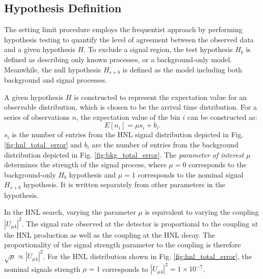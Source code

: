 


\subsection{Hypothesis Definition}
\label{sec:hypothesis_def}
The setting limit procedure employs the frequentist approach by performing hypothesis testing to quantify the level of agreement between the observed data and a given hypothesis $H$.
To exclude a signal region, the test hypothesis $H_{b}$ is defined as describing only known processes, or a background-only model.
Meanwhile, the null hypothesis $H_{s+b}$ is defined as the model including both background and signal processes.

A given hypothesis $H$ is constructed to represent the expectation value for an observable distribution, which is chosen to be the arrival time distribution.
For a series of observations $n$, the expectation value of the bin $i$ can be constructed as:
\begin{equation}
\label{eq:expectation}
    E[n_i] = \mu s_i + b_i.
\end{equation}
$s_i$ is the number of entries from the HNL signal distribution depicted in Fig. \ref{fig:hnl_total_error} and $b_i$ are the number of entries from the background distribution depicted in Fig. \ref{fig:bkg_total_error}.
The \textit{parameter of interest} $\mu$ determines the strength of the signal process, where $\mu = 0$ corresponds to the background-only $H_{b}$ hypothesis and $\mu = 1$ corresponds to the nominal signal $H_{s+b}$ hypothesis.
It is written separately from other parameters in the hypothesis.

In the HNL search, varying the parameter $\mu$ is equivalent to varying the coupling $|U_{\mu4}|^{2}$.
The signal rate observed at the detector is proportional to the coupling at the HNL production as well as the coupling at the HNL decay.
The proportionality of the signal strength parameter to the coupling is therefore $\sqrt{\mu} \propto |U_{\mu4}|^{2}$.
For the HNL distribution shown in Fig. \ref{fig:hnl_total_error}, the nominal signals strength $\mu = 1$ corresponds to $|U_{\mu4}|^{2}= 1 \times 10^{-7}$.

